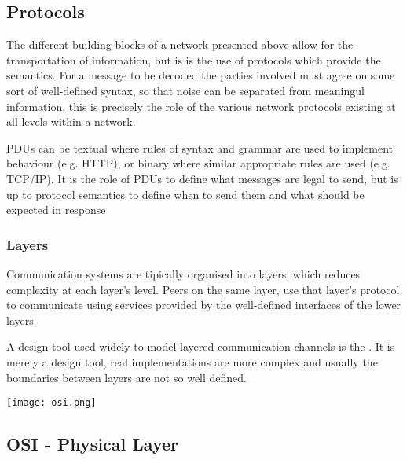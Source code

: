 \subsection{Protocols}

	\par{The different building blocks of a network presented above allow for the transportation of information, but is is the use of protocols which provide the semantics. For a message to be decoded the parties involved must agree on some sort of well-defined syntax, so that noise can be separated from meaningul information, this is precisely the role of the various network protocols existing at all levels within a network.}


	\par{PDUs can be textual where rules of syntax and grammar are used to implement behaviour (e.g. HTTP), or binary where similar appropriate rules are used (e.g. TCP/IP). It is the role of PDUs to define what messages are legal to send, but is up to protocol semantics to define when to send them and what should be expected in response}

\subsubsection{Layers}

	\par{Communication systems are tipically organised into layers, which reduces complexity at each layer's level. Peers on the same layer, use that layer's protocol to communicate using services provided by the well-defined interfaces of the lower layers}


	\par{A design tool used widely to model layered communication channels is the . It is merely a design tool, real implementations are more complex and usually the boundaries between layers are not so well defined.}

	\texttt{[image: osi.png]}

\subsection{OSI - Physical Layer}

